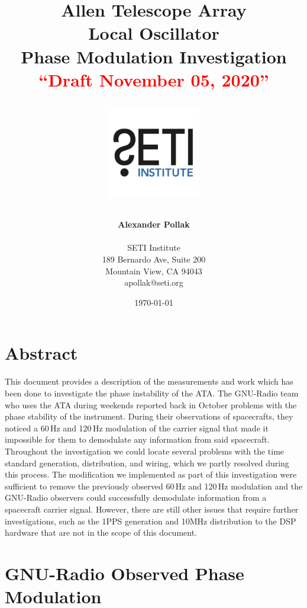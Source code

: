 \documentclass[12pt]{article}
\title{\Huge Allen Telescope Array\\
\vspace{0.5cm}
Local Oscillator\\Phase Modulation Investigation\\
\vspace{1.5cm} %
\textcolor{red}{“Draft November 05, 2020” }
\normalsize \emph{}
\vspace{1cm} %
\begin{center}
\includegraphics[height=4cm]{titlepage/SETI_institute_logo.jpg}
\end{center}
}
\author{ 

\textbf{ Alexander Pollak} \\
\vspace{1cm}


SETI Institute \\ 
189 Bernardo Ave, Suite 200 \\
Mountain View, CA 94043 \\ 
apollak@seti.org\\
}
\date{\today}
\begin{document}
\clearpage\maketitle
\thispagestyle{empty}

\newpage
\thispagestyle{empty}
\section*{Abstract}

This document provides a description of the measurements and work which has been done to investigate the phase instability of the ATA. The GNU-Radio team who uses the ATA during weekends reported back in October problems with the phase stability of the instrument. 
During their observations of spacecrafts, they noticed a 60\,Hz and 120\,Hz modulation of the carrier signal that made it impossible for them to demodulate any information from said spacecraft. Throughout the investigation we could locate several problems with the time standard generation, distribution, and wiring, which we partly resolved during this process. The modification we implemented as part of this investigation were sufficient to remove the previously observed 60\,Hz and 120\,Hz modulation and the GNU-Radio observers could successfully demodulate information from a spacecraft carrier signal. However, there are still other issues that require further investigations, such as the 1PPS generation and 10MHz distribution to the DSP hardware that are not in the scope of this document.








\noindent 
%



%

\newpage
\thispagestyle{empty}
\tableofcontents
\newpage

\section{GNU-Radio Observed Phase Modulation}
\label{sec:1}
\end{document}
